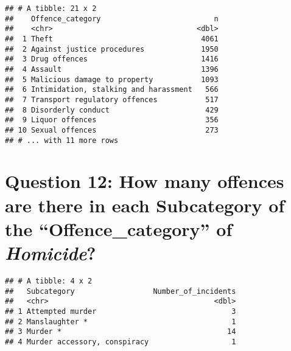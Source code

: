 \documentclass[
]{article}
\newenvironment{Shaded}{\begin{snugshade}}{\end{snugshade}}
\newcommand{\CommentTok}[1]{\textcolor[rgb]{0.56,0.35,0.01}{\textit{#1}}}
\newcommand{\DataTypeTok}[1]{\textcolor[rgb]{0.13,0.29,0.53}{#1}}
\newcommand{\KeywordTok}[1]{\textcolor[rgb]{0.13,0.29,0.53}{\textbf{#1}}}
\newcommand{\NormalTok}[1]{#1}
\newcommand{\OperatorTok}[1]{\textcolor[rgb]{0.81,0.36,0.00}{\textbf{#1}}}
\newcommand{\StringTok}[1]{\textcolor[rgb]{0.31,0.60,0.02}{#1}}
\begin{document}
\begin{verbatim}
## # A tibble: 21 x 2
##    Offence_category                          n
##    <chr>                                 <dbl>
##  1 Theft                                  4061
##  2 Against justice procedures             1950
##  3 Drug offences                          1416
##  4 Assault                                1396
##  5 Malicious damage to property           1093
##  6 Intimidation, stalking and harassment   566
##  7 Transport regulatory offences           517
##  8 Disorderly conduct                      429
##  9 Liquor offences                         356
## 10 Sexual offences                         273
## # ... with 11 more rows
\end{verbatim}

\hypertarget{question-12-how-many-offences-are-there-in-each-subcategory-of-the-offence_category-of-homicide}{%
\section{\texorpdfstring{Question 12: How many offences are there in
each Subcategory of the ``Offence\_category'' of
\emph{Homicide}?}{Question 12: How many offences are there in each Subcategory of the ``Offence\_category'' of Homicide?}}\label{question-12-how-many-offences-are-there-in-each-subcategory-of-the-offence_category-of-homicide}}

\begin{Shaded}
\end{Shaded}

\begin{verbatim}
## # A tibble: 4 x 2
##   Subcategory                  Number_of_incidents
##   <chr>                                      <dbl>
## 1 Attempted murder                               3
## 2 Manslaughter *                                 1
## 3 Murder *                                      14
## 4 Murder accessory, conspiracy                   1
\end{verbatim}
\end{document}
